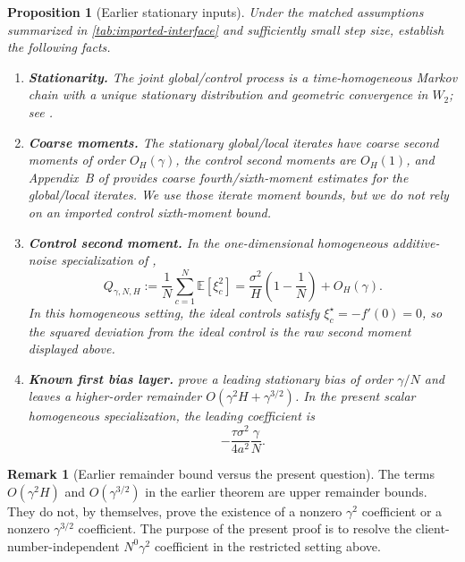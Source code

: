 \documentclass[11pt]{article}
\newtheorem{proposition}[proposition]{Proposition}
\theoremstyle{definition}
\newtheorem{remark}[remark]{Remark}
\newcommand{\E}{\mathbb{E}}
\newcommand{\QH}{Q_{\gamma,N,H}}
\begin{document}
\begin{proposition}[Earlier stationary inputs]
\label{prop:anchor-inputs}
Under the matched assumptions summarized in \cref{tab:imported-interface} and sufficiently small step size, \citet{mangold2025scaffold} establish the following facts.
\begin{enumerate}[label=\textup{(L\arabic*)}]
  \item \textbf{Stationarity.} The joint global/control process is a time-homogeneous Markov chain with a unique stationary distribution and geometric convergence in $W_2$; see \citet[Theorem~4.2]{mangold2025scaffold}.
  \item \textbf{Coarse moments.} The stationary global/local iterates have coarse second moments of order $O_H(\gamma)$, the control second moments are $O_H(1)$, and Appendix~B of \citet{mangold2025scaffold} provides coarse fourth/sixth-moment estimates for the global/local iterates. We use those iterate moment bounds, but we do \emph{not} rely on an imported control sixth-moment bound.
  \item \textbf{Control second moment.} In the one-dimensional homogeneous additive-noise specialization of \citet[Lemma~5.1 and Appendix~E.2]{mangold2025scaffold},
  \begin{equation}
  \label{eq:anchor-QH}
    \QH:=\frac1N\sum_{c=1}^N\E[\xi_c^2]
    =\frac{\sigma^2}{H}\left(1-\frac1N\right)+O_H(\gamma).
  \end{equation}
  In this homogeneous setting, the ideal controls satisfy $\xi_c^\star=-f'(0)=0$, so the squared deviation from the ideal control is the raw second moment displayed above.
  \item \textbf{Known first bias layer.} \citet[Theorem~5.3]{mangold2025scaffold} prove a leading stationary bias of order $\gamma/N$ and leaves a higher-order remainder $O(\gamma^2H+\gamma^{3/2})$. In the present scalar homogeneous specialization, the leading coefficient is
  \begin{equation}
  \label{eq:anchor-bias-leading}
    -\frac{\tau\sigma^2}{4a^2}\frac{\gamma}{N}.
  \end{equation}
\end{enumerate}
\end{proposition}

\begin{remark}[Earlier remainder bound versus the present question]
The terms $O(\gamma^2H)$ and $O(\gamma^{3/2})$ in the earlier theorem are upper remainder bounds. They do not, by themselves, prove the existence of a nonzero $\gamma^2$ coefficient or a nonzero $\gamma^{3/2}$ coefficient. The purpose of the present proof is to resolve the client-number-independent $N^0\gamma^2$ coefficient in the restricted setting above.
\end{remark}
\end{document}
